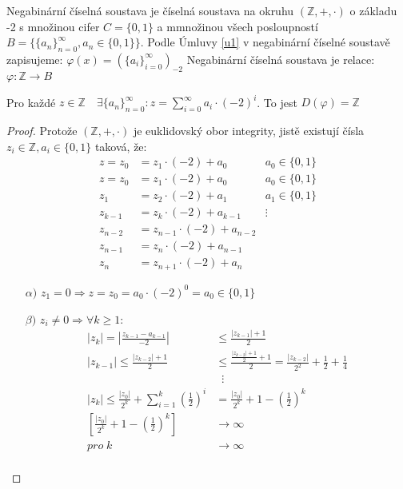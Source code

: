 \documentclass[czech,bachelor,dept470,male]{diploma}
\newcommand{\posla}{\{a_i\}_{i=0}^{\infty}}
\begin{document}
\begin{definition}
	Negabinární číselná soustava je číselná soustava na okruhu $(\mathbb{Z},+,\cdot)$ o základu -2 s množinou cifer $C=\{0,1\}$ a mmnožinou všech posloupností
	$B=\{\{a_n\}_{n=0}^\infty,a_n \in \{0,1\} \}$.\newline
	Podle Úmluvy \ref{u1} v negabinární číselné soustavě zapisujeme:
	$\varphi(x) = (\posla)_{-2}$\newline
	Negabinární číselná soustava je relace:
	$\varphi:\mathbb{Z}\to B$
\end{definition}
\begin{theorem}
	Pro každé $z \in \mathbb{Z} \quad \exists\{a_n\}_{n=0}^\infty:z=\sum_{i=0}^{\infty}a_i\cdot(-2)^i$. To jest $D(\varphi)=\mathbb{Z}$
\end{theorem}
\begin{proof}\label{negaDF}
	Protože $(\mathbb{Z},+,\cdot)$ je euklidovský obor integrity, jistě existují čísla $z_i\in\mathbb{Z}, a_i\in\{0,1\}$ taková, že:
	\begin{align}
	 z=z_0&=z_1\cdot(-2)+a_0&  a_0\in\{0,1\}\nonumber\\
	 z=z_0&=z_1\cdot(-2)+a_0& a_0\in\{0,1\}\nonumber\\
	 z_1&=z_2\cdot(-2)+a_1& a_1\in\{0,1\}\nonumber\\
	 z_{k-1}&=z_k\cdot(-2)+a_{k-1}&\vdots\quad\quad\;\nonumber\\
	 z_{n-2}&=z_{n-1}\cdot(-2)+a_{n-2}\nonumber\\
	 z_{n-1}&=z_n\cdot(-2)+a_{n-1}\nonumber\\
	 z_n&=z_{n+1}\cdot(-2)+a_n\nonumber
	\end{align}
	\begin{enumerate}
		\item[$\alpha)$] $z_1=0 \Rightarrow z=z_0=a_0\cdot(-2)^0=a_0\in\{0,1\}$
		\item[$\beta)$]  $z_i \ne 0 \Rightarrow \forall k \ge 1:$
		\begin{align}
		|z_k|=\left|\frac{z_{k-1}-a_{k-1}}{-2}\right|&\le \frac{|z_{k-1}|+1}{2}\nonumber\\
		|z_{k-1}|\le\frac{|z_{k-2}|+1}{2}&\le\frac{\frac{|z_{k-2}|+1}{2}+1}{2}=\frac{|z_{k-2}|}{2^2}+\frac{1}{2}+\frac{1}{4}\nonumber\\
		&\;\;\vdots\nonumber\\
		|z_k|\le\frac{|z_0|}{2^k}+\sum_{i=1}^{k}\left(\frac{1}{2}\right)^i&=\frac{|z_0|}{2^k}+1-\left(\frac{1}{2}\right)^k \nonumber\\
		\left[\frac{|z_0|}{2^k}+1-\left(\frac{1}{2}\right)^k\right]&\to\infty\nonumber\\
		pro\; k &\to \infty\nonumber\\
		\end{align}
		

\end{enumerate}
\end{proof}
\end{document}
